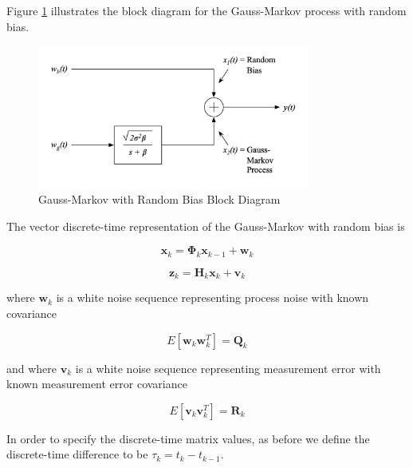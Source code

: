 \documentclass[12pt]{article}
\begin{document}
Figure \ref{fig:GMRB-block-diagram} illustrates the block diagram for the Gauss-Markov
process with random bias.

\begin{figure}[ht]
    \centering
    \includegraphics[width=0.8\textwidth]{GMRB-Block-Diagram.png}
    \caption{Gauss-Markov with Random Bias Block Diagram}
    \label{fig:GMRB-block-diagram}
\end{figure}

The vector discrete-time representation of the Gauss-Markov with random bias is

\begin{equation}
    \mathbf{x}_k = \mathbf{\Phi}_k \mathbf{x}_{k-1} + \mathbf{w}_k
    \label{eq:GMRB-discrete-state-equation}
\end{equation}

\begin{equation}
    \mathbf{z}_k = \mathbf{H}_k \mathbf{x}_{k} + \mathbf{v}_k
    \label{eq:GMRB-discrete-measurement-equation}
\end{equation}

where $\mathbf{w}_k$ is a white noise sequence representing process noise with known
covariance

\begin{equation}
    E[\mathbf{w}_k \mathbf{w}_k^T] = \mathbf{Q}_k
    \label{eq:GMRB-discrete-process-covariance}
\end{equation}

and where $\mathbf{v}_k$ is a white noise sequence representing measurement error with
known measurement error covariance

\begin{equation}
    E[\mathbf{v}_k \mathbf{v}_k^T] = \mathbf{R}_k
    \label{eq:GMRB-discrete-measurement-covariance}
\end{equation}

In order to specify the discrete-time matrix values, as before we define the discrete-time
difference to be $\tau_k = t_k - t_{k-1}$.
\end{document}
